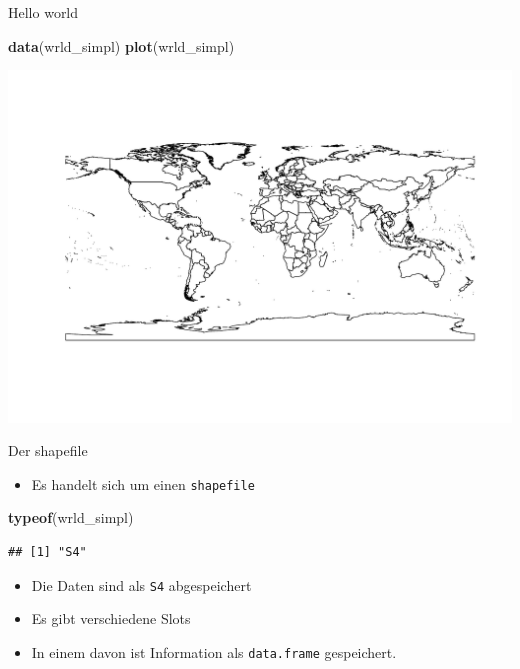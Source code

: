 \documentclass[ignorenonframetext,]{beamer}
\newenvironment{Shaded}{\begin{snugshade}}{\end{snugshade}}
\newcommand{\KeywordTok}[1]{\textcolor[rgb]{0.26,0.66,0.93}{\textbf{#1}}}
\newcommand{\NormalTok}[1]{\textcolor[rgb]{0.74,0.68,0.62}{#1}}
\providecommand{\tightlist}{%
  \setlength{\itemsep}{0pt}\setlength{\parskip}{0pt}}
\begin{document}
\begin{frame}[fragile]{Hello world}

\begin{Shaded}
\begin{Highlighting}[]
\KeywordTok{data}\NormalTok{(wrld_simpl)}
\KeywordTok{plot}\NormalTok{(wrld_simpl)}
\end{Highlighting}
\end{Shaded}

\includegraphics{Geomedizin_files/figure-beamer/unnamed-chunk-47-1.pdf}

\end{frame}

\begin{frame}[fragile]{Der shapefile}

\begin{itemize}
\tightlist
\item
  Es handelt sich um einen \texttt{shapefile}
\end{itemize}

\begin{Shaded}
\begin{Highlighting}[]
\KeywordTok{typeof}\NormalTok{(wrld_simpl)}
\end{Highlighting}
\end{Shaded}

\begin{verbatim}
## [1] "S4"
\end{verbatim}

\begin{itemize}
\tightlist
\item
  Die Daten sind als \texttt{S4} abgespeichert
\item
  Es gibt verschiedene Slots
\item
  In einem davon ist Information als \texttt{data.frame} gespeichert.
\end{itemize}

\end{frame}
\end{document}
